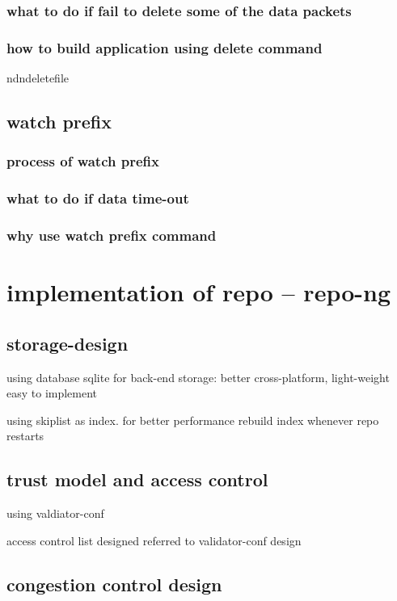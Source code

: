 \documentclass[conference]{IEEEtran}
\begin{document}
\subsubsection{what to do if fail to delete some of the data packets}

\subsubsection{how to build application using delete command}
ndndeletefile

\subsection{watch prefix}

\subsubsection{process of watch prefix}

\subsubsection{what to do if data time-out}

\subsubsection{why use watch prefix command}

\section{implementation of repo -- repo-ng}
\subsection{storage-design}
using database sqlite for back-end storage: better cross-platform, light-weight easy to implement

using skiplist as index. for better performance rebuild index whenever repo restarts

\subsection{trust model and access control}
using valdiator-conf

access control list designed referred to validator-conf design

\subsection{congestion control design}
\end{document}
